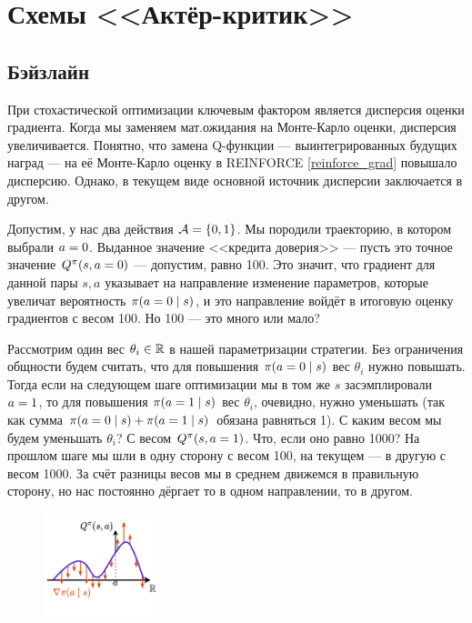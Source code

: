 \section{Схемы <<Актёр-критик>>}\label{ActorCriticSection}

\subsection{Бэйзлайн}

При стохастической оптимизации ключевым фактором является дисперсия оценки градиента. Когда мы заменяем мат.ожидания на Монте-Карло оценки, дисперсия увеличивается. Понятно, что замена Q-функции --- выинтегрированных будущих наград --- на её Монте-Карло оценку в REINFORCE \eqref{reinforce_grad} повышало дисперсию. Однако, в текущем виде основной источник дисперсии заключается в другом.

\begin{example}
Допустим, у нас два действия $\mathcal{A} = \{0, 1\}$. Мы породили траекторию, в котором выбрали $a \HM= 0$. Выданное значение <<кредита доверия>> --- пусть это точное значение $Q^{\pi}(s, a \HM= 0)$ --- допустим, равно 100. Это значит, что градиент для данной пары $s, a$ указывает на направление изменение параметров, которые увеличат вероятность $\pi(a \HM= 0 \HM\mid s)$, и это направление войдёт в итоговую оценку градиентов с весом 100. Но 100 --- это много или мало?

Рассмотрим один вес $\theta_i \in \mathbb{R}$ в нашей параметризации стратегии. Без ограничения общности будем считать, что для повышения $\pi(a \HM= 0 \HM\mid s)$ вес $\theta_i$ нужно повышать. Тогда если на следующем шаге оптимизации мы в том же $s$ засэмплировали $a \HM= 1$, то для повышения $\pi(a \HM= 1 \HM\mid s)$ вес $\theta_i$, очевидно, нужно уменьшать (так как сумма $\pi(a \HM= 0 \HM\mid s) \HM+ \pi(a \HM= 1 \HM\mid s)$ обязана равняться 1). С каким весом мы будем уменьшать $\theta_i$? С весом $Q^{\pi}(s, a \HM= 1)$. Что, если оно равно 1000? На прошлом шаге мы шли в одну сторону с весом 100, на текущем --- в другую с весом 1000. За счёт разницы весов мы в среднем движемся в правильную сторону, но нас постоянно дёргает то в одном направлении, то в другом.
\end{example}

\begin{figure}
\vspace{-0.2cm}
\centering
\includegraphics[width=0.3\textwidth]{Images/Baseline.png}
\vspace{-1cm}
\end{figure}


